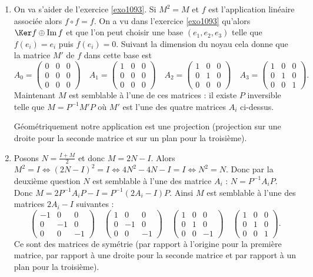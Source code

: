 \documentclass[11pt,a4paper]{article}
\renewcommand{\Im}{\mathop{\mathrm{Im}}\nolimits}
\newcounter{exo}
\begin{document}
\begin{enumerate}
  \item On va s'aider de l'exercice \ref{exo1093}. Si $M^2=M$ et $f$ est l'application linéaire associée 
alors $f\circ f= f$. On a vu dans l'exercice \ref{exo1093} qu'alors $\Ker f \oplus \Im f$
et que l'on peut choisir une base $(e_1,e_2,e_3)$ telle que $f(e_i)=e_i$ 
puis $f(e_i)=0$. Suivant la dimension du noyau cela donne que la matrice $M'$ de $f$ dans cette base est
$$A_0=\begin{pmatrix}0&0&0\\0&0&0\\0&0&0\end{pmatrix}\quad
A_1=\begin{pmatrix}1&0&0\\0&0&0\\0&0&0\end{pmatrix} \quad 
A_2=\begin{pmatrix}1&0&0\\0&1&0\\0&0&0\end{pmatrix} \quad 
A_3=\begin{pmatrix}1&0&0\\0&1&0\\0&0&1\end{pmatrix}.$$
Maintenant $M$ est semblable à l'une de ces matrices : il existe $P$ inversible telle que $M=P^{-1}M'P$
où $M'$ est l'une des quatre matrices $A_i$ ci-dessus.

Géométriquement notre application est une projection (projection sur une droite pour la seconde matrice 
et sur un plan pour la troisième).

  \item Posons $N= \frac{I+M}{2}$ et donc $M=2N-I$.
  Alors $M^2=I \iff (2N-I)^2=I \iff 4N^2-4N-I=I \iff N^2=N$.
  Donc par la deuxième question $N$ est semblable à l'une des matrice $A_i$ :
  $N= P^{-1}A_iP$.
  Donc $M=2P^{-1}A_iP-I = P^{-1}(2A_i-I)P$.
  Ainsi $M$ est semblable à l'une des matrices $2A_i-I$ suivantes :
$$\begin{pmatrix}-1&0&0\\0&-1&0\\0&0&-1\end{pmatrix}\quad
\begin{pmatrix}1&0&0\\0&-1&0\\0&0&-1\end{pmatrix} \quad 
\begin{pmatrix}1&0&0\\0&1&0\\0&0&-1\end{pmatrix} \quad 
\begin{pmatrix}1&0&0\\0&1&0\\0&0&1\end{pmatrix}.$$  
Ce sont des matrices de symétrie (par rapport à l'origine pour la première matrice, par rapport à une droite pour la seconde matrice 
et par rapport à un plan pour la troisième).


\end{enumerate}
\end{document}
